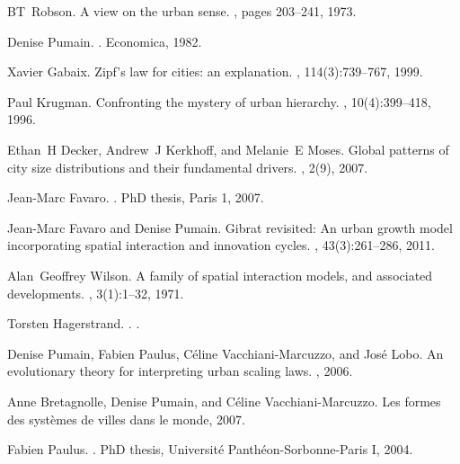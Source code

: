 \documentclass[11pt]{article}
\begin{document}
\begin{thebibliography}{10}
BT~Robson.
\newblock A view on the urban sense.
, pages 203--241, 1973.

Denise Pumain.
.
\newblock Economica, 1982.

Xavier Gabaix.
\newblock Zipf's law for cities: an explanation.
, 114(3):739--767, 1999.

Paul Krugman.
\newblock Confronting the mystery of urban hierarchy.
,
  10(4):399--418, 1996.

Ethan~H Decker, Andrew~J Kerkhoff, and Melanie~E Moses.
\newblock Global patterns of city size distributions and their fundamental
  drivers.
, 2(9), 2007.

Jean-Marc Favaro.
.
\newblock PhD thesis, Paris 1, 2007.

Jean-Marc Favaro and Denise Pumain.
\newblock Gibrat revisited: An urban growth model incorporating spatial
  interaction and innovation cycles.
, 43(3):261--286, 2011.

Alan~Geoffrey Wilson.
\newblock A family of spatial interaction models, and associated developments.
, 3(1):1--32, 1971.

Torsten Hagerstrand.
.
.

Denise Pumain, Fabien Paulus, C{\'e}line Vacchiani-Marcuzzo, and Jos{\'e} Lobo.
\newblock An evolutionary theory for interpreting urban scaling laws.
, 2006.

Anne Bretagnolle, Denise Pumain, and C{\'e}line Vacchiani-Marcuzzo.
\newblock Les formes des syst{\`e}mes de villes dans le monde, 2007.

Fabien Paulus.
.
\newblock PhD thesis, Universit{\'e} Panth{\'e}on-Sorbonne-Paris I, 2004.


\end{thebibliography}
\end{document}
